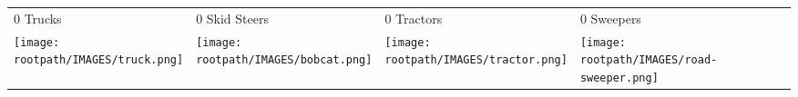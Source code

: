 \begin{tabular}{m{}m{}m{}m{}}
    {\color{ccorange} 0 Trucks} & {\color{ccorange} 0 Skid Steers} & {\color{ccorange} 0 Tractors} & {\color{ccorange} 0 Sweepers} \\
    \texttt{[image: \\rootpath/IMAGES/truck.png]}  & \texttt{[image: \\rootpath/IMAGES/bobcat.png]} & \texttt{[image: \\rootpath/IMAGES/tractor.png]} & \texttt{[image: \\rootpath/IMAGES/road-sweeper.png]}                         
    \end{tabular}